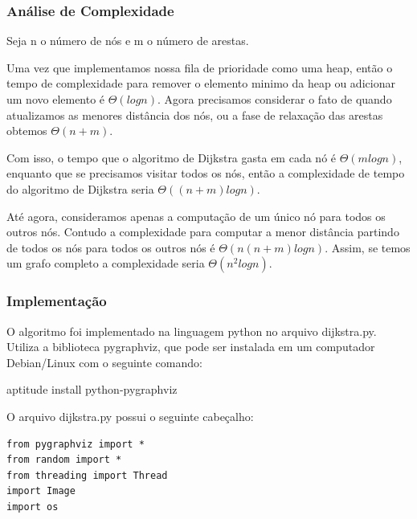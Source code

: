 \documentclass[a4paper,12pt]{article}
\begin{document}
\subsubsection{Análise de Complexidade}
Seja n o número de nós e m o número de arestas.

Uma vez que implementamos nossa fila de prioridade como uma heap, então o tempo de complexidade para remover o elemento minimo da heap ou adicionar um novo elemento é \emph{$\Theta(log n)$}.
Agora precisamos considerar o fato de quando atualizamos as menores distância  dos nós, ou a fase de relaxação das arestas obtemos \emph{$\Theta(n+m)$}.

Com isso, o tempo que o algoritmo de Dijkstra gasta em cada nó é \emph{$\Theta(m log n)$}, enquanto que se precisamos visitar todos os nós, então a complexidade de tempo do algoritmo de Dijkstra seria \emph{$\Theta((n+m)log n)$}.

Até agora, consideramos apenas a computação de um único nó para todos os outros nós. Contudo a complexidade para computar a menor distância partindo de todos os nós para todos os outros nós é \emph{$\Theta(n (n+m)log n)$}. Assim, se temos um grafo completo a complexidade seria \emph{$\Theta(n^2 log n)$}.

\subsubsection{Implementação}
O algoritmo foi implementado na linguagem python no arquivo dijkstra.py. Utiliza a biblioteca pygraphviz, que pode ser instalada em um computador Debian/Linux com o seguinte comando:

aptitude install python-pygraphviz

O arquivo dijkstra.py possui o seguinte cabeçalho:
\begin{lstlisting}
from pygraphviz import *
from random import *
from threading import Thread
import Image
import os
\end{lstlisting}
\end{document}
